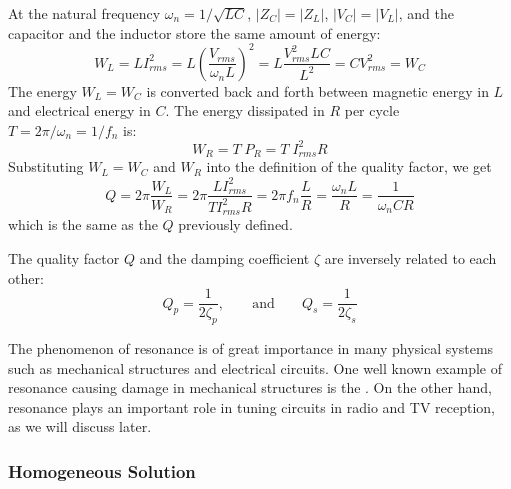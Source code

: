 \documentclass{article}
\begin{document}
At the natural frequency $\omega_n=1/\sqrt{LC}$, $|Z_C|=|Z_L|$, 
$|V_C|=|V_L|$, and the capacitor and the inductor store the same 
amount of energy:
\begin{equation}
  W_L=LI^2_{rms}=L \left( \frac{V_{rms}}{\omega_nL}\right)^2
  =L\frac{V^2_{rms}LC}{L^2}=CV^2_{rms}=W_C 
\end{equation}
The energy $W_L=W_C$ is converted back and forth between magnetic 
energy in $L$ and electrical energy in $C$. The energy dissipated 
in $R$ per cycle $T=2\pi/\omega_n=1/f_n$ is:
\begin{equation}
  W_R=T\;P_R = T\;I^2_{rms} R 
\end{equation}
Substituting $W_L=W_C$ and $W_R$ into the definition of the quality 
factor, we get
\begin{equation}
  Q=2\pi\frac{W_L}{W_R}=2\pi\frac{LI^2_{rms}}{TI^2_{rms}R }
  =2\pi f_n\frac{L}{R}=\frac{\omega_nL}{R}=\frac{1}{\omega_nCR}
\end{equation}
which is the same as the $Q$ previously defined.

The quality factor $Q$ and the damping coefficient $\zeta$ are inversely
related to each other:
\begin{equation}
  Q_p=\frac{1}{2\zeta_p},\;\;\;\;\;\;\;\mbox{and}\;\;\;\;\;\;\;
  Q_s=\frac{1}{2\zeta_s}
\end{equation}

The phenomenon of resonance is of great importance in many physical 
systems such as mechanical structures and electrical circuits. One 
well known example of resonance causing damage in mechanical 
structures is the 
.
On the other hand, resonance plays an important role in tuning
circuits in radio and TV reception, as we will discuss later.


\subsubsection*{Homogeneous Solution}
\end{document}
